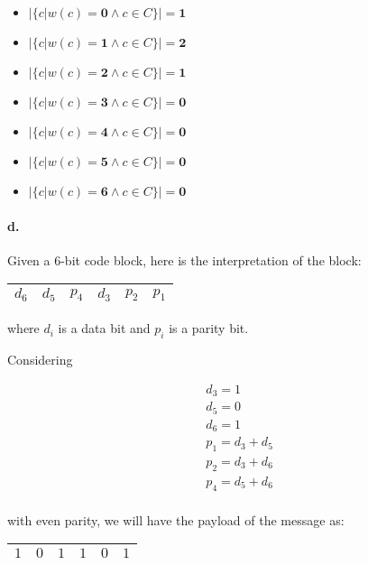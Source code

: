 \documentclass{article}
\begin{document}
\begin{itemize}
  \item $|\{c|w(c)=\textbf{0} \land c \in C\}| = \textbf{1}$
  \item $|\{c|w(c)=\textbf{1} \land c \in C\}| = \textbf{2}$
  \item $|\{c|w(c)=\textbf{2} \land c \in C\}| = \textbf{1}$
  \item $|\{c|w(c)=\textbf{3} \land c \in C\}| = \textbf{0}$
  \item $|\{c|w(c)=\textbf{4} \land c \in C\}| = \textbf{0}$
  \item $|\{c|w(c)=\textbf{5} \land c \in C\}| = \textbf{0}$
  \item $|\{c|w(c)=\textbf{6} \land c \in C\}| = \textbf{0}$
\end{itemize}

\paragraph{d.} Given a 6-bit code block, here is the interpretation of the block:

\begin{center}
  \begin{tabular}{|c|c|c|c|c|c|}
    \hline
    \cellcolor{YellowGreen} $d_6$ & \cellcolor{YellowGreen} $d_5$ & \cellcolor{GreenYellow} $p_4$ & \cellcolor{YellowGreen} $d_3$ & \cellcolor{GreenYellow} $p_2$ & \cellcolor{GreenYellow} $p_1$ \\
    \hline
  \end{tabular}
\end{center}

where $d_i$ is a data bit and $p_i$ is a parity bit.

Considering

\begin{align*}
  & d_3 = 1 \\
  & d_5 = 0 \\
  & d_6 = 1 \\
  & p_1 = d_3 + d_5 \\
  & p_2 = d_3 + d_6 \\
  & p_4 = d_5 + d_6 \\
\end{align*}

with even parity, we will have the payload of the message as:

\begin{center}
  \begin{tabular}{|c|c|c|c|c|c|}
    \hline
    \cellcolor{YellowGreen} $1$ & \cellcolor{YellowGreen} $0$ & \cellcolor{GreenYellow} $1$ & \cellcolor{YellowGreen} $1$ & \cellcolor{GreenYellow} $0$ & \cellcolor{GreenYellow} $1$ \\
    \hline
  \end{tabular}
\end{center}
\end{document}
